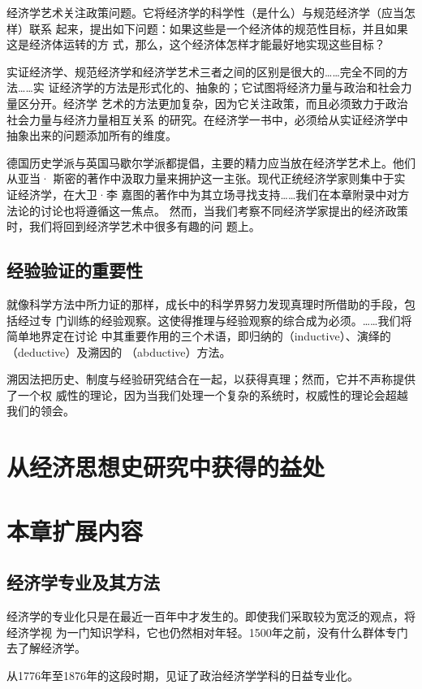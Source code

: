 经济学艺术关注政策问题。它将经济学的科学性（是什么）与规范经济学（应当怎样）联系
起来，提出如下问题：如果这些是一个经济体的规范性目标，并且如果这是经济体运转的方
式，那么，这个经济体怎样才能最好地实现这些目标？

实证经济学、规范经济学和经济学艺术三者之间的区别是很大的……完全不同的方法……实
证经济学的方法是形式化的、抽象的；它试图将经济力量与政治和社会力量区分开。经济学
艺术的方法更加复杂，因为它关注政策，而且必须致力于政治社会力量与经济力量相互关系
的研究。在经济学一书中，必须给从实证经济学中抽象出来的问题添加所有的维度。

德国历史学派与英国马歇尔学派都提倡，主要的精力应当放在经济学艺术上。他们从亚当·
斯密的著作中汲取力量来拥护这一主张。现代正统经济学家则集中于实证经济学，在大卫·李
嘉图的著作中为其立场寻找支持……我们在本章附录中对方法论的讨论也将遵循这一焦点。
然而，当我们考察不同经济学家提出的经济政策时，我们将回到经济学艺术中很多有趣的问
题上。

\subsection{经验验证的重要性}

就像科学方法中所力证的那样，成长中的科学界努力发现真理时所借助的手段，包括经过专
门训练的经验观察。这使得推理与经验观察的综合成为必须。……我们将简单地界定在讨论
中其重要作用的三个术语，即归纳的（inductive）、演绎的（deductive）及溯因的
（abductive）方法。

溯因法把历史、制度与经验研究结合在一起，以获得真理；然而，它并不声称提供了一个权
威性的理论，因为当我们处理一个复杂的系统时，权威性的理论会超越我们的领会。

\section{从经济思想史研究中获得的益处}

\section{本章扩展内容}

\subsection{经济学专业及其方法}

经济学的专业化只是在最近一百年中才发生的。即使我们采取较为宽泛的观点，将经济学视
为一门知识学科，它也仍然相对年轻。1500年之前，没有什么群体专门去了解经济学。

从1776年至1876年的这段时期，见证了政治经济学学科的日益专业化。

